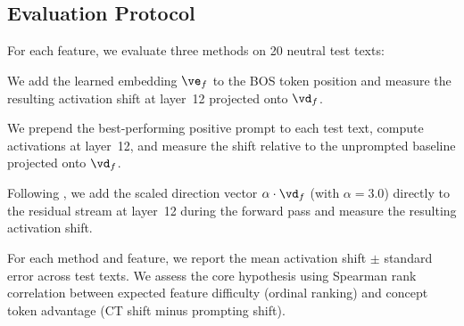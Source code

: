 \subsection{Evaluation Protocol}
\label{sec:evaluation}

For each feature, we evaluate three methods on 20 neutral test texts:

 We add the learned embedding $\ve_f$ to the BOS token position and measure the resulting activation shift at layer~12 projected onto $\vd_f$.

 We prepend the best-performing positive prompt to each test text, compute activations at layer~12, and measure the shift relative to the unprompted baseline projected onto $\vd_f$.

 Following \citet{turner2023steering}, we add the scaled direction vector $\alpha \cdot \vd_f$ (with $\alpha = 3.0$) directly to the residual stream at layer~12 during the forward pass and measure the resulting activation shift.

For each method and feature, we report the mean activation shift $\pm$ standard error across test texts. We assess the core hypothesis using Spearman rank correlation between expected feature difficulty (ordinal ranking) and concept token advantage (CT shift minus prompting shift).
